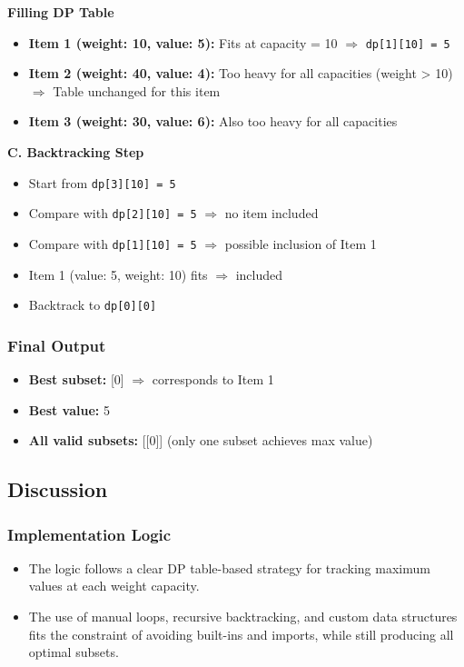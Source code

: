 \documentclass{article}
\begin{document}
\textbf{Filling DP Table}
\begin{itemize}
    \item \textbf{Item 1 (weight: 10, value: 5):}
    Fits at capacity = 10
    $\Rightarrow$ \texttt{dp[1][10] = 5}
    \item \textbf{Item 2 (weight: 40, value: 4):}
    Too heavy for all capacities (weight > 10)
    $\Rightarrow$ Table unchanged for this item
    \item \textbf{Item 3 (weight: 30, value: 6):}
    Also too heavy for all capacities
\end{itemize}

\textbf{C. Backtracking Step}

\begin{itemize}
    \item Start from \texttt{dp[3][10] = 5}
    \item Compare with \texttt{dp[2][10] = 5} $\Rightarrow$ no item included
    \item Compare with \texttt{dp[1][10] = 5} $\Rightarrow$ possible inclusion of Item 1
    \item Item 1 (value: 5, weight: 10) fits $\Rightarrow$ included
    \item Backtrack to \texttt{dp[0][0]}
\end{itemize}
\subsubsection*{Final Output}
\begin{itemize}
    \item \textbf{Best subset:} [0] $\Rightarrow$ corresponds to Item 1
    \item \textbf{Best value:} 5
    \item \textbf{All valid subsets:} [[0]] (only one subset achieves max value)
\end{itemize}

\subsection*{Discussion}
\subsubsection*{Implementation Logic}
\begin{itemize}
    \item The logic follows a clear DP table-based strategy for tracking maximum values at each weight capacity. 
    \item The use of manual loops, recursive backtracking, and custom data structures fits the constraint of avoiding built-ins and imports, while still producing all optimal subsets.
\end{itemize}
\end{document}
